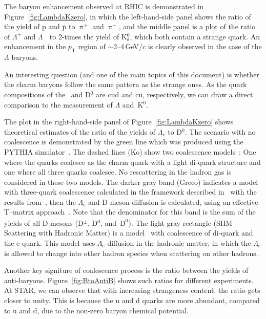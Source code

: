The baryon enhancement observed at RHIC is demonstrated in Figure~\ref{fig:LambdaKzero}, in which the left-hand-side panel shows the ratio of the yield of p and $\overline{\mathrm{p}}$ to $\uppi^+$ and $\uppi^-$, and the middle panel is a plot of the ratio of $\Lambda^+$ and $\overline{\Lambda}^-$ to 2-times the yield of K$^0_\mathrm{s}$, which both contain a strange quark. An enhancement in the $p_\mathrm{T}$ region of $\sim$2--4$\,$GeV$/c$ is clearly observed in the case of the $\Lambda$ baryons. 

An interesting question (and one of the main topics of this document) is whether the charm baryons follow the same pattern as the strange ones. As the quark compositions of the \Lambdac\ and D$^0$ are cud and c$\overline{\mathrm{u}}$, respectively, we can draw a direct comparison to the measurement of $\Lambda$ and~K$^0$.

The plot in the right-hand-side panel of Figure~\ref{fig:LambdaKzero} shows theoretical estimates of the ratio of the yields of $\Lambda_\mathrm{c}$ to D$^0$. The scenario with no coalescence is demonstrated by the green line which was produced using the PYTHIA simulator~\cite{PYTHIA}. The dashed lines (Ko) show two coalescence models~\cite{ShaoSong}: One where the  quarks coalesce as the charm quark with a light di-quark structure and one where all three quarks coalesce. No rescattering in the hadron gas is considered in these two models. The darker gray band (Greco) indicates a model with three-quark coalescence calculated in the framework described in~\cite{Greco_framework} with the results from~\cite{Greco_results}, then the $\Lambda_\mathrm{c}$ and D meson diffusion is calculated, using an effective T--matrix approach~\cite{Ghosh_Lc_rescattering}. Note that the denominator for this band is the sum of the yields of all D mesons (D$^\pm$, D$^0$, and~$\mathrm{\overline{D^0}}$). The light gray rectangle (SHM --- Scattering with Hadronic Matter) is a model~\cite{SHM} with coalescence of di-quark and the c-quark. This model uses $\Lambda_\mathrm{c}$ diffusion in the hadronic matter, in which the $\Lambda_\mathrm{c}$ is allowed to change into other hadron species when scattering on other hadrons.

Another key signiture of coalescence process is the ratio between the yields of anti-baryons. Figure~\ref{fig:BtoAntiB} shows such ratios for different experiments. At STAR, we can observe that with increasing strangeness content, the ratio gets closer to unity. This is because the u and d quarks are more abundant, compared to $\overline{\mathrm{u}}$ and $\overline{\mathrm{d}}$, due to the non-zero baryon chemical potential. 

